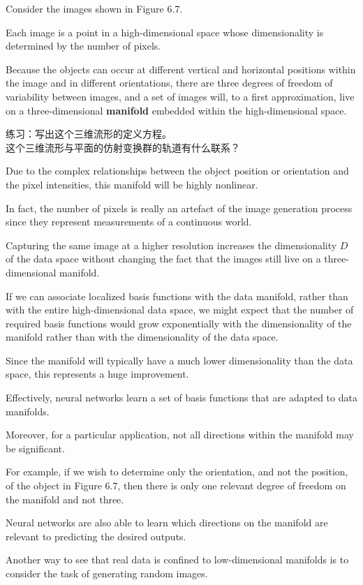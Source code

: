 \documentclass{article}
\begin{document}
Consider the images shown in Figure 6.7. 

Each image is a point in a high-dimensional space whose dimensionality is determined by the number of pixels. 

Because the objects can occur at different vertical and horizontal positions within the image and in different orientations, there are three degrees of freedom of variability between images, and a set of images will, to a first approximation, live on a three-dimensional \textbf{manifold} embedded within the high-dimensional space. 

{\color{red}
练习：写出这个三维流形的定义方程。\\ 
这个三维流形与平面的仿射变换群的轨道有什么联系？
}

Due to the complex relationships between the object position or orientation and the pixel intensities, this manifold will be highly nonlinear.

In fact, the number of pixels is really an artefact of the image generation process since they represent measurements of a continuous world. 

Capturing the same image at a higher resolution increases the dimensionality $D$ of the data space without changing the fact that the images still live on a three-dimensional manifold. 

If we can associate localized basis functions with the data manifold, rather than with the entire high-dimensional data space, we might expect that the number of required basis functions would grow exponentially with the dimensionality of the manifold rather than with the dimensionality of the data space. 

Since the manifold will typically have a much lower dimensionality than the data space, this represents a huge improvement. 

Effectively, neural networks learn a set of basis functions that are adapted to data manifolds. 

Moreover, for a particular application, not all directions within the manifold may be significant. 

For example, if we wish to determine only the orientation, and not the position, of the object in Figure 6.7, then there is only one relevant degree of freedom on the manifold and not three. 

Neural networks are also able to learn which directions on the manifold are relevant to predicting the desired outputs.

Another way to see that real data is confined to low-dimensional manifolds is to consider the task of generating random images. 
\end{document}
